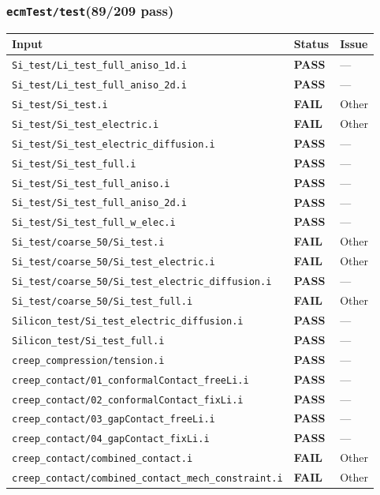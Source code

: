 \documentclass[10pt,letterpaper]{article}
\newcommand{\PASS}{\textcolor{passgreen}{\textbf{PASS}}}
\newcommand{\FAIL}{\textcolor{failred}{\textbf{FAIL}}}
\newcommand{\code}[1]{\texttt{\small #1}}
\begin{document}
\subsubsection{\code{ecmTest/test}\hfill (89/209 pass)}
\begin{longtable}{p{} l p{}}
\toprule
Input & Status & Issue \\
\midrule
\endhead
\code{Si\_test/Li\_test\_full\_aniso\_1d.i} & \PASS & --- \\
\code{Si\_test/Li\_test\_full\_aniso\_2d.i} & \PASS & --- \\
\code{Si\_test/Si\_test.i} & \FAIL & Other \\
\code{Si\_test/Si\_test\_electric.i} & \FAIL & Other \\
\code{Si\_test/Si\_test\_electric\_diffusion.i} & \PASS & --- \\
\code{Si\_test/Si\_test\_full.i} & \PASS & --- \\
\code{Si\_test/Si\_test\_full\_aniso.i} & \PASS & --- \\
\code{Si\_test/Si\_test\_full\_aniso\_2d.i} & \PASS & --- \\
\code{Si\_test/Si\_test\_full\_w\_elec.i} & \PASS & --- \\
\code{Si\_test/coarse\_50/Si\_test.i} & \FAIL & Other \\
\code{Si\_test/coarse\_50/Si\_test\_electric.i} & \FAIL & Other \\
\code{Si\_test/coarse\_50/Si\_test\_electric\_diffusion.i} & \PASS & --- \\
\code{Si\_test/coarse\_50/Si\_test\_full.i} & \FAIL & Other \\
\code{Silicon\_test/Si\_test\_electric\_diffusion.i} & \PASS & --- \\
\code{Silicon\_test/Si\_test\_full.i} & \PASS & --- \\
\code{creep\_compression/tension.i} & \PASS & --- \\
\code{creep\_contact/01\_conformalContact\_freeLi.i} & \PASS & --- \\
\code{creep\_contact/02\_conformalContact\_fixLi.i} & \PASS & --- \\
\code{creep\_contact/03\_gapContact\_freeLi.i} & \PASS & --- \\
\code{creep\_contact/04\_gapContact\_fixLi.i} & \PASS & --- \\
\code{creep\_contact/combined\_contact.i} & \FAIL & Other \\
\code{creep\_contact/combined\_contact\_mech\_constraint.i} & \FAIL & Other \\

\end{longtable}
\end{document}

